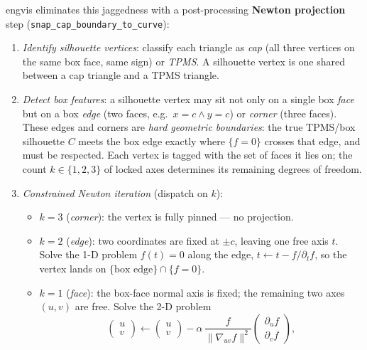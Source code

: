 \documentclass[11pt]{article}
\begin{document}
engvis eliminates this jaggedness with a post-processing
\textbf{Newton projection} step (\texttt{snap\_cap\_boundary\_to\_curve}):
\begin{enumerate}[leftmargin=2em]
  \item \emph{Identify silhouette vertices}: classify each triangle as
        \emph{cap} (all three vertices on the same box face, same
        sign) or \emph{TPMS}.  A silhouette vertex is one shared
        between a cap triangle and a TPMS triangle.
  \item \emph{Detect box features}: a silhouette vertex may sit not
        only on a single box \emph{face} but on a box \emph{edge}
        (two faces, e.g.\ $x = c \wedge y = c$) or \emph{corner}
        (three faces).  These edges and corners are \emph{hard
        geometric boundaries}: the true TPMS/box silhouette $C$ meets
        the box edge exactly where $\{f=0\}$ crosses that edge, and
        must be respected.  Each vertex is tagged with the set of
        faces it lies on; the count $k\in\{1,2,3\}$ of locked axes
        determines its remaining degrees of freedom.
  \item \emph{Constrained Newton iteration} (dispatch on $k$):
        \begin{itemize}
          \item $k=3$ (\emph{corner}): the vertex is fully pinned ---
                no projection.
          \item $k=2$ (\emph{edge}): two coordinates are fixed at
                $\pm c$, leaving one free axis $t$.  Solve the 1-D
                problem $f(t)=0$ along the edge,
                $t \leftarrow t - f/\partial_t f$, so the vertex lands
                on $\{\text{box edge}\}\cap\{f=0\}$.
          \item $k=1$ (\emph{face}): the box-face normal axis is fixed;
                the remaining two axes $(u,v)$ are free.  Solve the
                2-D problem
                \begin{equation}
                  \begin{pmatrix} u \\ v \end{pmatrix}
                  \leftarrow
                  \begin{pmatrix} u \\ v \end{pmatrix}
                  - \alpha\,\frac{f}{\|\nabla_{\!uv} f\|^2}
                  \begin{pmatrix} \partial_u f \\ \partial_v f \end{pmatrix},

\end{equation}
\end{itemize}
\end{enumerate}
\end{document}
